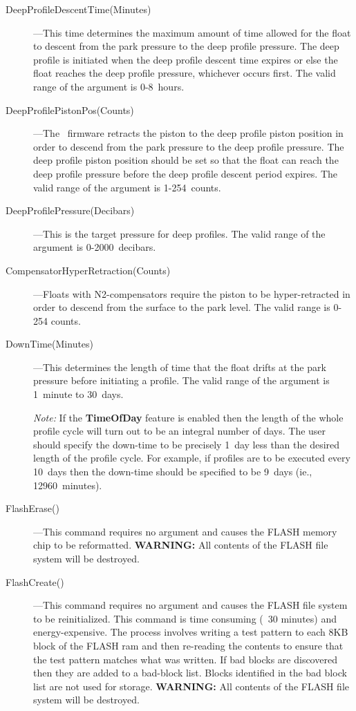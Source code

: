 \begin{description}
\item[DeepProfileDescentTime(Minutes)]---This time determines the maximum
  amount of time allowed for the float to descent from the park pressure to
  the deep profile pressure.  The deep profile is initiated when the deep
  profile descent time expires or else the float reaches the deep profile
  pressure, whichever occurs first.  The valid range of the argument is
  0-8~hours.

\item[DeepProfilePistonPos(Counts)]---The \apf\ firmware retracts the piston
  to the deep profile piston position in order to descend from the park
  pressure to the deep profile pressure.  The deep profile piston position
  should be set so that the float can reach the deep profile pressure before
  the deep profile descent period expires.  The valid range of the argument
  is 1-254~counts.

\item[DeepProfilePressure(Decibars)]---This is the target pressure for deep
  profiles.  The valid range of the argument is 0-2000~decibars.

\item[CompensatorHyperRetraction(Counts)]---Floats with N2-compensators
  require the piston to be hyper-retracted in order to descend from the
  surface to the park level.  The valid range is 0-254 counts.

\item[DownTime(Minutes)]---This determines the length of time that the float
  drifts at the park pressure before initiating a profile.  The valid range
  of the argument is 1~minute to 30~days.

  \emph{Note:} If the \textbf{TimeOfDay} feature is enabled then the length
  of the whole profile cycle will turn out to be an integral number of days.
  The user should specify the down-time to be precisely 1~day less than the
  desired length of the profile cycle.  For example, if profiles are to be
  executed every 10~days then the down-time should be specified to be 9~days
  (ie., 12960~minutes).

\item[FlashErase()]---This command requires no argument and causes the FLASH
  memory chip to be reformatted.  \textbf{WARNING:} All contents of the
  FLASH file system will be destroyed.

\item[FlashCreate()]---This command requires no argument and causes the
  FLASH file system to be reinitialized.  This command is time consuming
  (~30 minutes) and energy-expensive.  The process involves writing a test
  pattern to each 8KB block of the FLASH ram and then re-reading the
  contents to ensure that the test pattern matches what was written.  If bad
  blocks are discovered then they are added to a bad-block list.  Blocks
  identified in the bad block list are not used for storage.
  \textbf{WARNING:} All contents of the FLASH file system will be destroyed.


\end{description}
